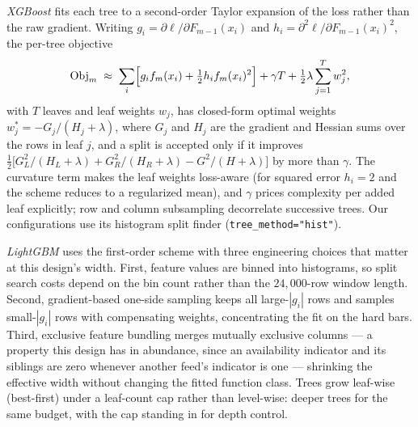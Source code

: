 \emph{XGBoost} \citep{Chen2016} fits each tree to a second-order Taylor
expansion of the loss rather than the raw gradient. Writing
$g_i = \partial \ell / \partial F_{m-1}(x_i)$ and
$h_i = \partial^2 \ell / \partial F_{m-1}(x_i)^2$, the per-tree objective
\begin{equation*}
    \mathrm{Obj}_m \;\approx\;
    \sum_{i} \Bigl[ g_i f_m(x_i) + \tfrac{1}{2} h_i f_m(x_i)^2 \Bigr]
    + \gamma T + \tfrac{1}{2} \lambda \sum_{j=1}^{T} w_j^2,
\end{equation*}
with $T$ leaves and leaf weights $w_j$, has closed-form optimal weights
$w_j^{*} = -G_j / (H_j + \lambda)$, where $G_j$ and $H_j$ are the
gradient and Hessian sums over the rows in leaf $j$, and a split is
accepted only if it improves
$\tfrac{1}{2}\bigl[ G_L^2/(H_L+\lambda) + G_R^2/(H_R+\lambda)
- G^2/(H+\lambda) \bigr]$ by more than $\gamma$. The curvature term makes
the leaf weights loss-aware (for squared error $h_i = 2$ and the scheme
reduces to a regularized mean), and $\gamma$ prices complexity per added
leaf explicitly; row and column subsampling decorrelate successive trees.
Our configurations use its histogram split finder
(\texttt{tree\_method="hist"}).

\emph{LightGBM} \citep{Ke2017} uses the first-order scheme with three
engineering choices that matter at this design's width. First, feature
values are binned into histograms, so split search costs depend on the
bin count rather than the $24{,}000$-row window length. Second,
gradient-based one-side sampling keeps all large-$|g_i|$ rows and samples
small-$|g_i|$ rows with compensating weights, concentrating the fit on
the hard bars. Third, exclusive feature bundling merges mutually
exclusive columns --- a property this design has in abundance, since an
availability indicator and its siblings are zero whenever another
feed's indicator is one --- shrinking the effective width without
changing the fitted function class. Trees grow leaf-wise (best-first)
under a leaf-count cap rather than level-wise: deeper trees for the same
budget, with the cap standing in for depth control.

